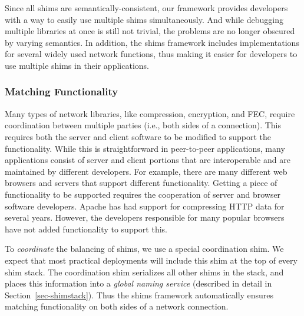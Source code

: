 Since all shims are semantically-consistent, our framework provides developers with a way to easily use multiple shims simultaneously.  And while debugging multiple libraries at once is still not trivial, the problems are no longer obscured by varying semantics.  In addition, the shims framework includes implementations for several widely used network functions, thus making it easier for developers to use multiple shims in their applications.

\subsubsection{Matching Functionality}
Many types of network libraries, like compression, encryption, and FEC, require coordination between multiple parties (i.e., both sides of a connection).   This requires both the server and client software to be modified to support the functionality.  While this is straightforward in peer-to-peer applications, many applications consist of server and client portions that are interoperable and are maintained by different developers.   For example, there are many different web browsers and servers that support different functionality.  Getting a piece of functionality to be supported requires the cooperation of server and browser software developers.   Apache has had support for compressing HTTP data for several years.   However, the developers responsible for many popular browsers have not added functionality to support this.   

To \textit{coordinate} the balancing of shims, we use a special coordination shim.  We expect that most practical deployments will include this shim at the top of every shim stack.   The coordination shim serializes all other shims in the stack, and places this information into a \emph{global naming service} (described in detail in Section~\ref{sec-shimstack}).  Thus the shims framework automatically ensures matching functionality on both sides of a network connection.

\fi

\fi
